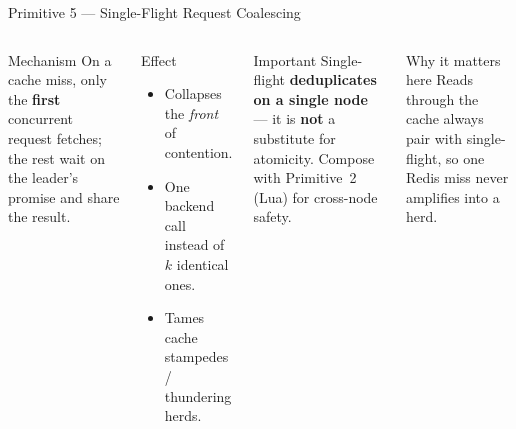 \documentclass[aspectratio=169,xcolor=dvipsnames,9pt]{beamer}
\begin{document}
\begin{frame}{Primitive 5 --- Single-Flight Request Coalescing}
\begin{columns}[T]
  \begin{block}{Mechanism}
    \footnotesize
    On a cache miss, only the \textbf{first} concurrent request fetches; the rest wait on the leader's promise and share the result.
  \end{block}
  \begin{exampleblock}{Effect}
    \footnotesize
    \begin{itemize}
      \item Collapses the \emph{front} of contention.
      \item One backend call instead of $k$ identical ones.
      \item Tames cache stampedes / thundering herds.
    \end{itemize}
  \end{exampleblock}

  \begin{alertblock}{Important}
    \footnotesize
    Single-flight \textbf{deduplicates on a single node} --- it is \textbf{not} a substitute for atomicity. Compose with Primitive~2 (Lua) for cross-node safety.
  \end{alertblock}
  \begin{block}{Why it matters here}
    \footnotesize
    Reads through the cache always pair with single-flight, so one Redis miss never amplifies into a herd.
  \end{block}
\end{columns}
\end{frame}
\end{document}
